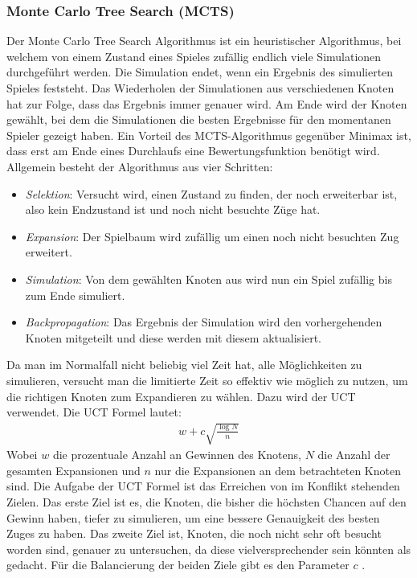 \documentclass[12pt,a4paper,bibliography=totocnumbered,listof=totocnumbered]{article}
\begin{document}
\subsubsection{Monte Carlo Tree Search (MCTS)}
\label{chap:MCTS}
Der Monte Carlo Tree Search Algorithmus ist ein heuristischer Algorithmus, bei welchem von einem
Zustand eines Spieles zufällig endlich viele Simulationen durchgeführt werden. Die Simulation endet, wenn
ein Ergebnis des simulierten Spieles feststeht. Das Wiederholen der Simulationen aus verschiedenen Knoten
hat zur Folge, dass das Ergebnis immer genauer wird. Am Ende wird der Knoten gewählt, bei dem die 
Simulationen die besten Ergebnisse für den momentanen Spieler gezeigt haben. Ein Vorteil des 
\ac{MCTS}-Algorithmus gegenüber Minimax ist, dass erst am Ende eines Durchlaufs eine Bewertungsfunktion
benötigt wird. Allgemein besteht der Algorithmus aus vier Schritten:
\begin{itemize}
    \item \textit{Selektion}: Versucht wird, einen Zustand zu finden, der noch erweiterbar ist, also
        kein Endzustand ist und noch nicht besuchte Züge hat.
    \item \textit{Expansion}: Der Spielbaum wird zufällig um einen noch nicht besuchten Zug erweitert.
    \item \textit{Simulation}: Von dem gewählten Knoten aus wird nun ein Spiel zufällig bis zum Ende 
        simuliert. 
    \item \textit{Backpropagation}: Das Ergebnis der Simulation wird den vorhergehenden Knoten mitgeteilt
        und diese werden mit diesem aktualisiert.
\end{itemize}
Da man im Normalfall nicht beliebig viel Zeit hat, alle Möglichkeiten zu simulieren, versucht man die limitierte Zeit
so effektiv wie möglich zu nutzen, um die richtigen Knoten zum Expandieren zu wählen. Dazu wird der \ac{UCT} verwendet.
Die \ac{UCT} Formel lautet:
\begin{align}
	w + c \sqrt{\frac{\log{N}}{n}}
\end{align}
Wobei $w$ die prozentuale Anzahl an Gewinnen des Knotens, $N$ die Anzahl der gesamten Expansionen und $n$ nur die Expansionen an dem 
betrachteten Knoten sind. Die Aufgabe der \ac{UCT} Formel ist das Erreichen von im Konflikt stehenden Zielen. Das erste Ziel ist es, die Knoten, die bisher die 
höchsten Chancen auf den Gewinn haben, tiefer zu simulieren, um eine bessere Genauigkeit des besten Zuges zu haben.
Das zweite Ziel ist, Knoten, die noch nicht sehr oft besucht worden sind, genauer zu untersuchen, da diese vielversprechender sein könnten als gedacht.
Für die Balancierung der beiden Ziele gibt es den Parameter $c$ \cite{DeepLearingGo}.
\end{document}
